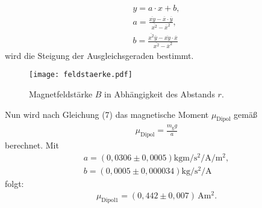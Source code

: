 \begin{align}
  y = a \cdot x + b, \\
  a = \frac{\overline{xy}-\overline{x}\cdot\overline{y}}{\overline{x^2}-\overline{x}^2}, \\
  b = \frac{\overline{x^2}\overline{y}-\overline{xy}\cdot\overline{x}}{\overline{x^2}-\overline{x}^2}
\end{align}
wird die Steigung der Ausgleichsgeraden bestimmt.

\begin{figure}
  \center
  \texttt{[image: feldstaerke.pdf]}
  \caption{Magnetfeldstärke $B$ in Abhängigkeit des Abstands $r$.}
  \label{fig:feldstaerke}
\end{figure}

\noindent Nun wird nach Gleichung (7) das magnetische Moment $\mu_\text{Dipol}$ gemäß
\begin{gather}
\mu_\text{Dipol} = \frac{m_\text{g}g}{a}
\end{gather}
berechnet.
Mit
\begin{align*}
a = (0,0306 \pm 0,0005) \si{\kilo\gram\meter\per\second\squared\per\ampere\per\meter\squared}, \\
b = (0,0005 \pm 0,000034) \si{\kilo\gram\per\second\squared\per\ampere}
\end{align*}
folgt:
\begin{gather*}
\mu_\text{Dipol1} = (0,442 \pm 0,007)\,\si{\ampere\meter\squared}.
\end{gather*}


